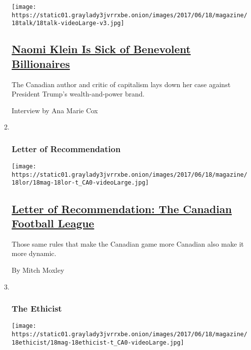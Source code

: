 \begin{enumerate}
  \texttt{[image: https://static01.graylady3jvrrxbe.onion/images/2017/06/18/magazine/18talk/18talk-videoLarge-v3.jpg]}

  \hypertarget{naomi-klein-is-sick-of-benevolent-billionaires}{%
  \subsection{\texorpdfstring{\href{/2017/06/14/magazine/naomi-klein-is-sick-of-benevolent-billionaires.html}{Naomi
  Klein Is Sick of Benevolent
  Billionaires}}{Naomi Klein Is Sick of Benevolent Billionaires}}\label{naomi-klein-is-sick-of-benevolent-billionaires}}

  The Canadian author and critic of capitalism lays down her case
  against President Trump's wealth-and-power brand.

  Interview by Ana Marie Cox
\item ~
  \hypertarget{letter-of-recommendation}{%
  \subsubsection{Letter of
  Recommendation}\label{letter-of-recommendation}}

  \texttt{[image: https://static01.graylady3jvrrxbe.onion/images/2017/06/18/magazine/18lor/18mag-18lor-t\_CA0-videoLarge.jpg]}

  \hypertarget{letter-of-recommendation-the-canadian-football-league}{%
  \subsection{\texorpdfstring{\href{/2017/06/15/magazine/letter-of-recommendation-the-canadian-football-league.html}{Letter
  of Recommendation: The Canadian Football
  League}}{Letter of Recommendation: The Canadian Football League}}\label{letter-of-recommendation-the-canadian-football-league}}

  Those same rules that make the Canadian game more Canadian also make
  it more dynamic.

  By Mitch Moxley
\item ~
  \hypertarget{the-ethicist}{%
  \subsubsection{The Ethicist}\label{the-ethicist}}

  \texttt{[image: https://static01.graylady3jvrrxbe.onion/images/2017/06/18/magazine/18ethicist/18mag-18ethicist-t\_CA0-videoLarge.jpg]}


\end{enumerate}
